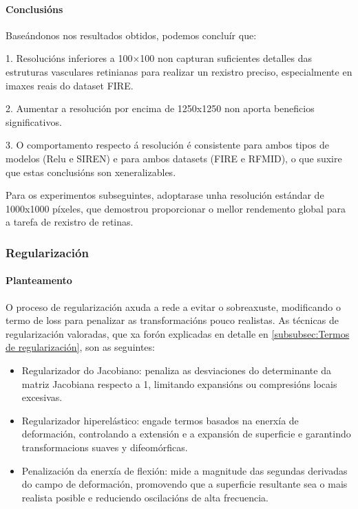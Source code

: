 \paragraph{Conclusións}
\label{par:Conclusións}

Baseándonos nos resultados obtidos, podemos concluír que:

1. Resolucións inferiores a 100×100 non capturan suficientes detalles das estruturas vasculares retinianas para realizar un rexistro preciso, especialmente en imaxes reais do dataset FIRE.

2. Aumentar a resolución por encima de 1250x1250 non aporta beneficios significativos.

3. O comportamento respecto á resolución é consistente para ambos tipos de modelos (Relu e SIREN) e para ambos datasets (FIRE e RFMID), o que suxire que estas conclusións son xeneralizables.

Para os experimentos subseguintes, adoptarase unha resolución estándar de 1000x1000 píxeles, que demostrou proporcionar o mellor rendemento global para a tarefa de rexistro de retinas.

\subsubsection{Regularización}
\label{subsubsec:Regularización}

\paragraph{Planteamento}
\label{par:Planteamento}
O proceso de regularización axuda a rede a evitar o sobreaxuste, modificando o termo de loss para penalizar as transformacións pouco realistas.
As técnicas de regularización valoradas, que xa forón explicadas en detalle en \ref{subsubsec:Termos de regularización}, son as seguintes:

\begin{itemize}
    \item Regularizador do Jacobiano: penaliza as desviaciones do determinante da matriz Jacobiana respecto a 1, limitando expansións ou compresións locais excesivas.
    \item Regularizador hiperelástico: engade termos basados na enerxía de deformación, controlando a extensión e a expansión de superficie e garantindo transformacions suaves y difeomórficas.
    \item Penalización da enerxía de flexión: mide a magnitude das segundas derivadas do campo de deformación, promovendo que a superficie resultante sea o mais realista posible e reduciendo oscilacións de alta frecuencia.
\end{itemize}

